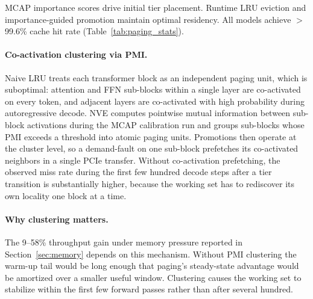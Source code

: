 \documentclass{article}
\begin{document}
MCAP importance scores drive initial tier placement. Runtime LRU eviction and
importance-guided promotion maintain optimal residency. All models achieve $>$99.6\%
cache hit rate (Table~\ref{tab:paging_stats}).

\paragraph{Co-activation clustering via PMI.} Naive LRU treats each transformer
block as an independent paging unit, which is suboptimal: attention and FFN
sub-blocks within a single layer are co-activated on every token, and adjacent
layers are co-activated with high probability during autoregressive decode.
NVE computes pointwise mutual information between sub-block activations during
the MCAP calibration run and groups sub-blocks whose PMI exceeds a threshold
into atomic paging units. Promotions then operate at the cluster level, so a
demand-fault on one sub-block prefetches its co-activated neighbors in a
single PCIe transfer. Without co-activation prefetching, the observed miss
rate during the first few hundred decode steps after a tier transition is
substantially higher, because the working set has to rediscover its own
locality one block at a time.

\paragraph{Why clustering matters.} The 9--58\% throughput gain under memory
pressure reported in Section~\ref{sec:memory} depends on this mechanism.
Without PMI clustering the warm-up tail would be long enough that paging's
steady-state advantage would be amortized over a smaller useful window.
Clustering causes the working set to stabilize within the first few forward
passes rather than after several hundred.
\end{document}
